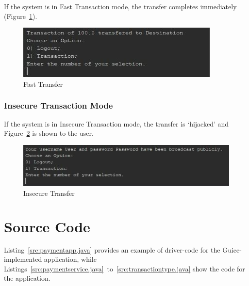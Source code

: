 \documentclass[12pt,twocolumn]{IEEEtran}
\begin{document}
If the system is in Fast Transaction mode, the transfer completes immediately (Figure~\ref{fig:fast}).

\begin{figure}[h!]
	\centering
	\includegraphics[width=0.4\linewidth]{./Resources/cli-fast.jpg}
	\caption{Fast Transfer} \label{fig:fast}
\end{figure}

\subsubsection{Insecure Transaction Mode}

If the system is in Insecure Transaction mode, the transfer is `hijacked' and Figure~\ref{fig:insecure} is shown to the user.

\begin{figure}[h!]
	\centering
	\includegraphics[width=0.4\linewidth]{./Resources/cli-bad.jpg}
	\caption{Insecure Transfer} \label{fig:insecure}
\end{figure}


\clearpage
\section{Source Code} \label{app:code}
\setcounter{figure}{0}  
\setcounter{equation}{0} 
\setcounter{table}{0}

Listing~\ref{src:paymentapp.java} provides an example of driver-code for the Guice-implemented application, while Listings~\ref{src:paymentservice.java}~to~\ref{src:transactiontype.java} show the code for the application.






\end{document}
